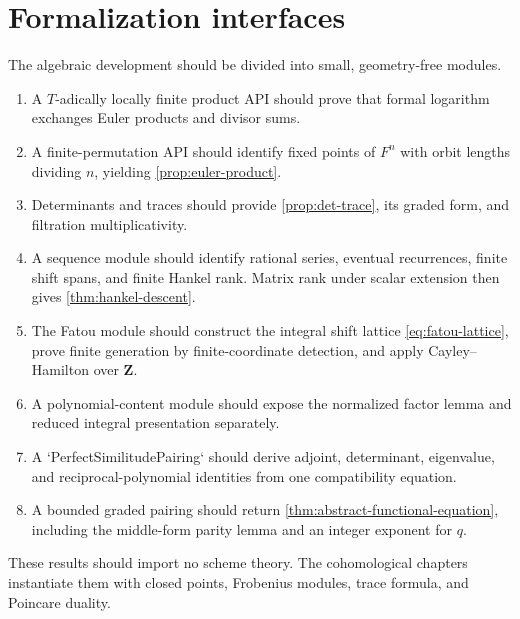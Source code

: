 \section{Formalization interfaces}

\begin{formalization}
The algebraic development should be divided into small, geometry-free
modules.
\begin{enumerate}
\item A \(T\)-adically locally finite product API should prove that
      formal logarithm exchanges Euler products and divisor sums.
\item A finite-permutation API should identify fixed points of \(F^n\)
      with orbit lengths dividing \(n\), yielding
      \cref{prop:euler-product}.
\item Determinants and traces should provide
      \cref{prop:det-trace}, its graded form, and filtration
      multiplicativity.
\item A sequence module should identify rational series, eventual
      recurrences, finite shift spans, and finite Hankel rank.  Matrix
      rank under scalar extension then gives
      \cref{thm:hankel-descent}.
\item The Fatou module should construct the integral shift lattice
      \eqref{eq:fatou-lattice}, prove finite generation by finite-coordinate
      detection, and apply Cayley--Hamilton over \(\mathbf Z\).
\item A polynomial-content module should expose the normalized factor
      lemma and reduced integral presentation separately.
\item A `PerfectSimilitudePairing` should derive adjoint, determinant,
      eigenvalue, and reciprocal-polynomial identities from one
      compatibility equation.
\item A bounded graded pairing should return
      \cref{thm:abstract-functional-equation}, including the middle-form
      parity lemma and an integer exponent for \(q\).
\end{enumerate}
These results should import no scheme theory.  The cohomological chapters
instantiate them with closed points, Frobenius modules, trace formula,
and Poincare duality.
\end{formalization}
